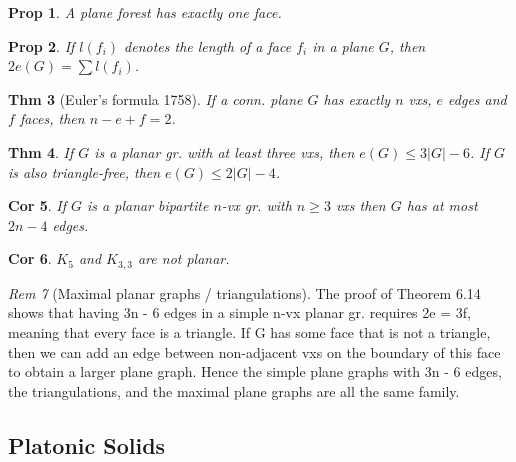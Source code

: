 \documentclass[11pt, fleqn, a4paper, landscape]{article}
\theoremstyle{plain} %
\newtheorem{thm}{Thm}
\newtheorem{pro}[thm]{Prop}
\newtheorem{cor}[thm]{Cor}
\theoremstyle{remark} %
\newtheorem{rem}[thm]{Rem}
\theoremstyle{definition} %
\newtheorem{defi}[thm]{Def}
\begin{document}
\begin{multicols}{5}
\begin{pro}
A plane forest has exactly one face.
\end{pro}

\addtocounter{thm}{2}
\begin{pro}
If $l(f_i)$ denotes the length of a face $f_i$ in a plane $G$, then $2e(G) = \sum l(f_i)$.
\end{pro}

\begin{thm}[Euler's formula 1758]
If a conn. plane $G$ has exactly $n$ vxs, $e$ edges
and $f$ faces, then $n - e + f = 2$.
\end{thm}

\addtocounter{thm}{1}
\begin{thm}
If $G$ is a planar gr. with at least three vxs, then $e(G) \le 3|G|- 6$. If $G$ is also triangle-free, then $e(G)\le 2|G|- 4$.
\end{thm}

\begin{cor}
If $G$ is a planar bipartite $n$-vx gr. with $n \ge 3$ vxs then $G$ has at most $2n - 4$ edges.
\end{cor}

\begin{cor}
$K_5$ and $K_{3,3}$ are not planar.
\end{cor}

\begin{rem}[Maximal planar graphs / triangulations]
The proof of Theorem 6.14 shows that
having 3n - 6 edges in a simple n-vx planar gr. requires 2e = 3f, meaning that every face is
a triangle. If G has some face that is not a triangle, then we can add an edge between non-adjacent
vxs on the boundary of this face to obtain a larger plane graph. Hence the simple plane graphs
with 3n - 6 edges, the triangulations, and the maximal plane graphs are all the same family.
\end{rem}

\subsection{Platonic Solids}


\end{multicols}
\end{document}
